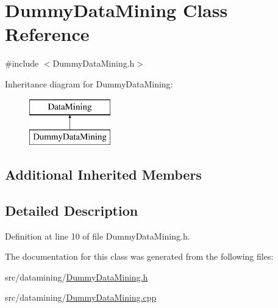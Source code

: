 \hypertarget{class_dummy_data_mining}{}\section{Dummy\+Data\+Mining Class Reference}
\label{class_dummy_data_mining}


{\ttfamily \#include $<$Dummy\+Data\+Mining.\+h$>$}

Inheritance diagram for Dummy\+Data\+Mining\+:\begin{figure}[H]
\begin{center}
\leavevmode
\includegraphics[height=2.000000cm]{class_dummy_data_mining}
\end{center}
\end{figure}
\subsection*{Additional Inherited Members}


\subsection{Detailed Description}


Definition at line 10 of file Dummy\+Data\+Mining.\+h.



The documentation for this class was generated from the following files\+:\begin{DoxyCompactItemize}
\item 
src/datamining/\hyperlink{_dummy_data_mining_8h}{Dummy\+Data\+Mining.\+h}\item 
src/datamining/\hyperlink{_dummy_data_mining_8cpp}{Dummy\+Data\+Mining.\+cpp}\end{DoxyCompactItemize}
